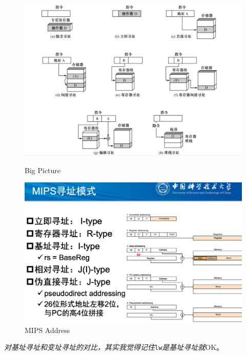 \documentclass[]{report}
\begin{document}
		\begin{figure}[h]
			\centering
			\begin{minipage}{20em}
				\centering
				\includegraphics[scale = 0.12]{images/memory_visiting.png}
				\caption{Big Picture}
			\end{minipage}
			\qquad
			\begin{minipage}{20em}
				\centering
				\includegraphics[scale = 0.12]{images/MIPS_addr_seek.png}
				\caption{MIPS Address}
			\end{minipage}
		\end{figure}\par
		\textit{对基址寻址和变址寻址的对比，其实我觉得记住}\verb|lw|\textit{是基址寻址就}OK。
\end{document}
